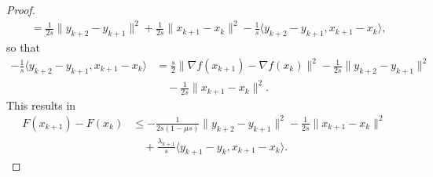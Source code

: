 \documentclass[pdflatex,sn-mathphys-num]{sn-jnl}
\theoremstyle{thmstyleone}
\theoremstyle{thmstyletwo}
\theoremstyle{thmstylethree}
\begin{document}
\begin{proof}
\begin{align*}
&= \frac{1}{2s} \| y_{k+2} - y_{k+1} \|^2 + \frac{1}{2s}\| x_{k+1} - x_k \|^2 
   - \frac{1}{s}\langle y_{k+2} - y_{k+1}, x_{k+1} - x_k \rangle,
\end{align*}
so that
\begin{align*}
- \frac{1}{s}\langle y_{k+2} - y_{k+1}, x_{k+1} - x_k \rangle 
&= \frac{s}{2}\| \nabla f(x_{k+1}) - \nabla f(x_k) \|^2
   - \frac{1}{2s} \| y_{k+2} - y_{k+1} \|^2 \\ 
&\quad - \frac{1}{2s}\| x_{k+1} - x_k \|^2.
\end{align*}
This results in
\begin{align*}
F(x_{k+1}) - F(x_k) 
&\le - \frac{1}{2s(1-\mu s)} \| y_{k+2} - y_{k+1} \|^2 
    - \frac{1}{2s}\| x_{k+1} - x_k \|^2 \\
&\quad + \frac{\lambda_{k+1}}{s} \langle y_{k+1}-y_k, x_{k+1} - x_k \rangle.
\end{align*}



\end{proof}
\end{document}
